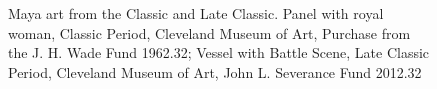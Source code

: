 \documentclass[../main.tex]{subfiles}
\begin{document}
\begin{figure}
    \centering
    \hfill
    \caption[Maya art from the Classic and Late Classic]{Maya art from the Classic and Late Classic.
              Panel with royal woman, 
             Classic Period, Cleveland Museum of Art, Purchase from the J. H. Wade Fund 1962.32;
              Vessel with Battle Scene, 
             Late Classic Period, Cleveland Museum of Art, John L. Severance Fund 2012.32}
\end{figure}
\end{document}
